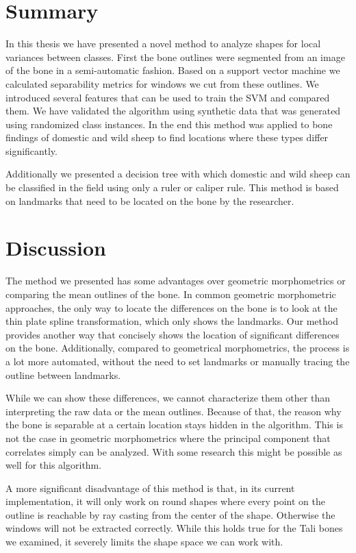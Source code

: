 \documentclass[pdftex,12pt,a4paper]{report}
\begin{document}
\section{Summary}

In this thesis we have presented a novel method to analyze shapes for local variances between classes. First the bone outlines were segmented from an image of the bone in a semi-automatic fashion. Based on a support vector machine we calculated separability metrics for windows we cut from these outlines. We introduced several features that can be used to train the SVM and compared them. We have validated the algorithm using synthetic data that was generated using randomized class instances. In the end this method was applied to bone findings of domestic and wild sheep to find locations where these types differ significantly.

Additionally we presented a decision tree with which domestic and wild sheep can be classified in the field using only a ruler or caliper rule. This method is based on landmarks that need to be located on the bone by the researcher.

\section{Discussion}

The method we presented has some advantages over geometric morphometrics or comparing the mean outlines of the bone. In common geometric morphometric approaches, the only way to locate the differences on the bone is to look at the thin plate spline transformation, which only shows the landmarks. Our method provides another way that concisely shows the location of significant differences on the bone. Additionally, compared to geometrical morphometrics, the process is a lot more automated, without the need to set landmarks or manually tracing the outline between landmarks.

While we can show these differences, we cannot characterize them other than interpreting the raw data or the mean outlines. Because of that, the reason why the bone is separable at a certain location stays hidden in the algorithm. This is not the case in geometric morphometrics where the principal component that correlates simply can be analyzed. With some research this might be possible as well for this algorithm.

A more significant disadvantage of this method is that, in its current implementation, it will only work on round shapes where every point on the outline is reachable by ray casting from the center of the shape. Otherwise the windows will not be extracted correctly. While this holds true for the Tali bones we examined, it severely limits the shape space we can work with.
\end{document}
